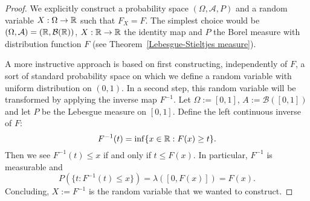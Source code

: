 \begin{proof}
We explicitly construct a probability space $(\Omega,\mathcal{A},P)$ and a random variable $X:\Omega\to\mathbb{R}$ such that $F_X=F$. The simplest choice would be $(\Omega,\mathcal{A})=(\mathbb{R},\mathcal{B}(\mathbb{R}))$, $X:\mathbb{R}\to\mathbb{R}$ the identity map and $P$ the Borel measure with distribution function $F$ (see Theorem~\ref{Lebesgue-Stieltjes measure}).\par
A more instructive approach is based on first constructing, independently of $F$, a sort of standard probability space on which we define a random variable with uniform distribution on $(0,1)$. In a second step, this random variable will be transformed by applying the inverse map $F^{-1}$. Let $\Omega:=[0,1]$, $A:=\mathcal{B}([0,1])$ and let $P$ be the Lebesgue measure on $[0,1]$. Define the left continuous inverse of $F$:
\[F^{-1}(t)=\inf\{x\in\mathbb{R}:F(x)\geq t\}.\]
Then we see $F^{-1}(t)\leq x$ if and only if $t\leq F(x)$. In particular, $F^{-1}$ is measurable and
\[P(\{t:F^{-1}(t)\leq x\})=\lambda([0,F(x)])=F(x).\]
Concluding, $X:=F^{-1}$ is the random variable that we wanted to construct.
\end{proof}
